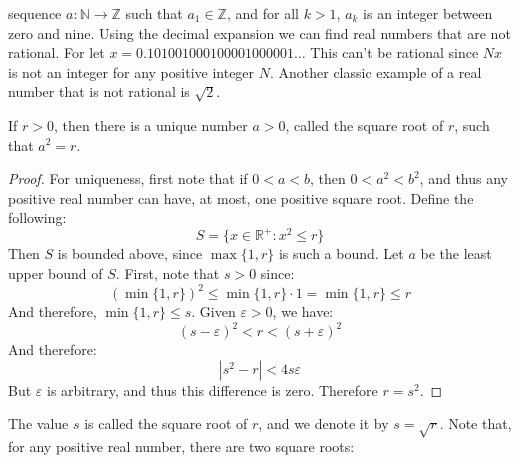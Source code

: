 \documentclass[crop=false,class=book,oneside]{standalone}
\begin{document}
            sequence $a:\mathbb{N}\rightarrow\mathbb{Z}$ such that
            $a_{1}\in\mathbb{Z}$, and for all $k>1$,
            $a_{k}$ is an integer between zero and nine. Using the
            decimal expansion we can find real numbers that are
            not rational. For let
            $x=0.101001000100001000001\dots$ This can't be
            rational since $Nx$ is not an integer for any
            positive integer $N$. Another classic example of
            a real number that is not rational is $\sqrt{2}$.
            \begin{theorem}
                If $r>0$, then there is a unique number $a>0$,
                called the square root of $r$, such that
                $a^{2}=r$.
            \end{theorem}
            \begin{proof}
                For uniqueness, first note that if
                $0<a<b$, then $0<a^{2}<b^{2}$, and thus
                any positive real number can have, at most, one
                positive square root. Define the following:
                \begin{equation}
                    S=\{x\in\mathbb{R}^{+}:x^{2}\leq{r}\}
                \end{equation}
                Then $S$ is bounded above, since $\max\{1,r\}$
                is such a bound. Let $a$ be the least upper bound
                of $S$. First, note that $s>0$ since:
                \begin{equation}
                    (\min\{1,r\})^{2}\leq\min\{1,r\}\cdot{1}
                    =\min\{1,r\}\leq{r}
                \end{equation}
                And therefore, $\min\{1,r\}\leq{s}$. Given
                $\varepsilon>0$, we have:
                \begin{equation}
                    (s-\varepsilon)^{2}<r<
                    (s+\varepsilon)^{2}
                \end{equation}
                And therefore:
                \begin{equation}
                    |s^{2}-r|<4s\varepsilon
                \end{equation}
                But $\varepsilon$ is arbitrary, and thus this
                difference is zero. Therefore $r=s^{2}$.
            \end{proof}
            The value $s$ is called the square root of $r$, and
            we denote it by $s=\sqrt{r}$. Note that, for any
            positive real number, there are two square roots:
\end{document}
